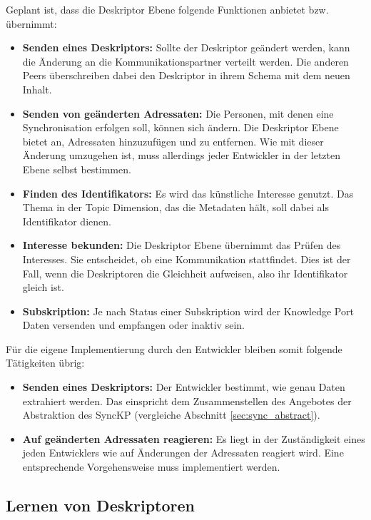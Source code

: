 \documentclass[a4paper]{article}
\begin{document}
	Geplant ist, dass die Deskriptor Ebene folgende Funktionen anbietet bzw.
	übernimmt:
		\begin{itemize}
		\item \textbf{Senden eines Deskriptors:} Sollte der Deskriptor geändert
		werden, kann die Änderung an die Kommunikationspartner
		verteilt werden. Die anderen Peers überschreiben dabei den Deskriptor
		in ihrem Schema mit dem neuen Inhalt.
		\item \textbf{Senden von geänderten Adressaten:} Die Personen, mit 
		denen eine Synchronisation erfolgen soll, können sich ändern. Die
		Deskriptor Ebene bietet an, Adressaten hinzuzufügen und zu entfernen.
		Wie mit dieser Änderung umzugehen ist, muss allerdings jeder Entwickler
		in der letzten Ebene selbst bestimmen.
		\item \textbf{Finden des Identifikators:} Es wird das künstliche Interesse
		genutzt. Das Thema in der Topic Dimension, das die Metadaten hält, soll
		dabei als Identifikator dienen.
		\item \textbf{Interesse bekunden:} Die Deskriptor Ebene übernimmt das
		Prüfen des Interesses. Sie entscheidet, ob eine Kommunikation stattfindet.
		Dies ist der Fall, wenn die Deskriptoren die Gleichheit aufweisen, also
		ihr Identifikator gleich ist.
		\item \textbf{Subskription:}  Je nach Status einer Subskription wird der
		Knowledge Port Daten versenden und empfangen oder inaktiv sein.		
	\end{itemize} 
	
	Für die eigene Implementierung durch den Entwickler bleiben somit folgende
	Tätigkeiten übrig:
	
	\begin{itemize}
		\item \textbf{Senden eines Deskriptors:} Der Entwickler bestimmt, wie
		genau Daten extrahiert werden. Das einspricht dem Zusammenstellen des
		Angebotes der Abstraktion des SyncKP (vergleiche Abschnitt
		\ref{sec:sync_abstract}).
		\item \textbf{Auf geänderten Adressaten reagieren:} Es liegt in der
		Zuständigkeit eines jeden Entwicklers wie auf Änderungen der Adressaten
		reagiert wird. Eine entsprechende Vorgehensweise muss implementiert 
		werden.
	\end{itemize} 
	
	\subsection{Lernen von Deskriptoren}
	
\end{document}
